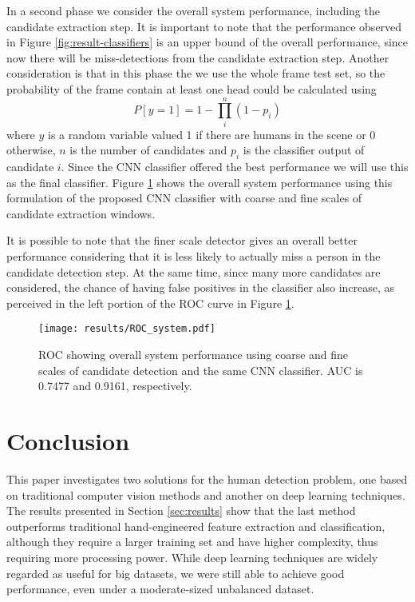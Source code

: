     In a second phase we consider the overall system performance, including the candidate extraction step. It is important to note that the performance observed in Figure \ref{fig:result-classifiers} is an upper bound of the overall performance, since now there will be miss-detections from the candidate extraction step. Another consideration is that in this phase the we use the whole frame test set, so the probability of the frame contain at least one head could be calculated using
    \begin{equation}
    P[y=1] = 1 - \prod_i^n (1-p_i)
    \end{equation}
    where $y$ is a random variable valued 1 if there are humans in the scene or 0 otherwise, $n$ is the number of candidates and $p_i$ is the classifier output of candidate $i$. Since the CNN classifier offered the best performance we will use this as the final classifier. Figure \ref{fig:result-system} shows the overall system performance using this formulation of the proposed CNN classifier with coarse and fine scales of candidate extraction windows.

    It is possible to note that the finer scale detector gives an overall better performance considering that it is less likely to actually miss a person in the candidate detection step. At the same time, since many more candidates are considered, the chance of having false positives in the classifier also increase, as perceived in the left portion of the ROC curve in Figure \ref{fig:result-system}.

    \begin{figure}
    \centering
    \texttt{[image: results/ROC\_system.pdf]}
    \caption{ROC showing overall system performance using coarse and fine scales of candidate detection and the same CNN classifier. AUC is 0.7477 and 0.9161, respectively.}
    \label{fig:result-system}
    \end{figure}



\section{Conclusion}
\label{sec:conclusion}
    This paper investigates two solutions for the human detection problem, one based on traditional computer vision methods and another on deep learning techniques. The results presented in Section \ref{sec:results} show that the last method outperforms traditional hand-engineered feature extraction and classification, although they require a larger training set and have higher complexity, thus requiring more processing power. While deep learning techniques are widely regarded as useful for big datasets, we were still able to achieve good performance, even under a moderate-sized unbalanced dataset.

